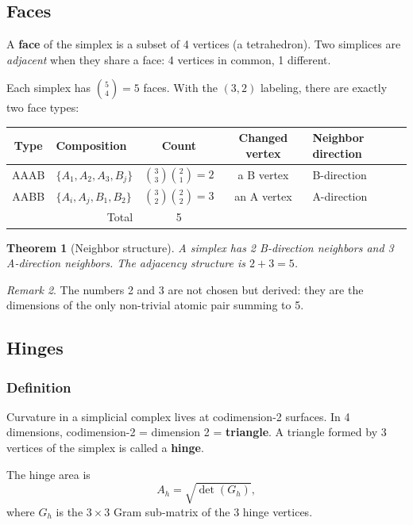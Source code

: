 \documentclass[12pt]{article}
\newtheorem{theorem}{Theorem}[section]
\theoremstyle{remark}
\newtheorem{remark}[theorem]{Remark}
\theoremstyle{definition}
\begin{document}
\subsection{Faces}

A \textbf{face} of the simplex is a subset of 4 vertices (a tetrahedron). Two simplices are \emph{adjacent} when they share a face: 4 vertices in common, 1 different.

Each simplex has $\binom{5}{4} = 5$ faces. With the $(3,2)$ labeling, there are exactly two face types:

\begin{center}
\begin{tabular}{clccl}
\hline
Type & Composition & Count & Changed vertex & Neighbor direction \\
\hline
AAAB & $\{A_1, A_2, A_3, B_j\}$ & $\binom{3}{3}\binom{2}{1} = 2$ & a B vertex & B-direction \\
AABB & $\{A_i, A_j, B_1, B_2\}$ & $\binom{3}{2}\binom{2}{2} = 3$ & an A vertex & A-direction \\
\hline
\multicolumn{2}{r}{Total} & 5 & & \\
\hline
\end{tabular}
\end{center}

\begin{theorem}[Neighbor structure]
A simplex has 2 B-direction neighbors and 3 A-direction neighbors. The adjacency structure is $2 + 3 = 5$.
\end{theorem}

\begin{remark}
The numbers 2 and 3 are not chosen but derived: they are the dimensions of the only non-trivial atomic pair summing to 5.
\end{remark}

\subsection{Hinges}

\subsubsection{Definition}

Curvature in a simplicial complex lives at codimension-2 surfaces. In 4 dimensions, codimension-2 = dimension 2 = \textbf{triangle}. A triangle formed by 3 vertices of the simplex is called a \textbf{hinge}.

The hinge area is
\begin{equation}
A_h = \sqrt{\det(G_h)},
\end{equation}
where $G_h$ is the $3 \times 3$ Gram sub-matrix of the 3 hinge vertices.
\end{document}
